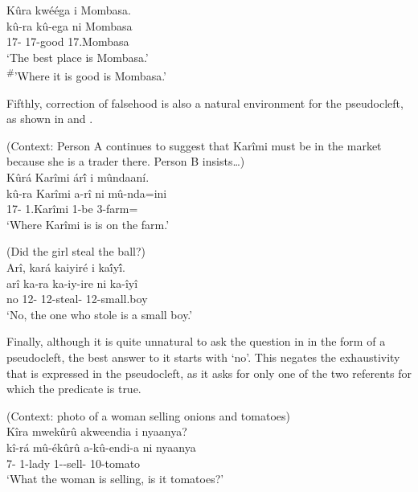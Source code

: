 \documentclass[output=paper]{langscibook}
\begin{document}
\ea
\label{bkm:Ref111648598}
Kûra kwééga i Mombasa.\\
\gll
kû-ra  kû-ega  ni  Mombasa\\
17-\RM{} 17-good \COP{} 17.Mombasa\\
\glt
‘The best place is Mombasa.’\\
\textsuperscript{\#}’Where it is good is Mombasa.’

\z


Fifthly, correction of falsehood is also a natural environment for the pseudocleft, as shown in  and .

\ea
\label{bkm:Ref111707394}
(Context: Person A continues to suggest that Karîmi must be in the market because she is a trader there. Person B insists…)\\
Kûrá Karîmi ár\'{î} i mûndaaní.\\
\gll
kû-ra  Karîmi  a-rî  ni  mû-nda=ini\\
17-\RM{} 1.Karîmi  1\SM{}-be \COP{} 3-farm=\LOC{}\\
\glt
‘Where Karîmi is is on the farm.’

\z

\ea
\label{bkm:Ref111707395}
(Did the girl steal the ball?)\\
Arî, kará kaiyiré i ka\'{î}y\'{î}.\\
\gll
arî  ka-ra  ka-iy-ire  ni  ka-îyî\\
no  12-\RM{} 12-steal-\PFV{} \COP{} 12-small.boy\\
\glt
‘No, the one who stole is a small boy.’

\z


Finally, although it is quite unnatural to ask the question in  in the form of a pseudocleft, the best answer to it starts with ‘no’. This negates the exhaustivity that is expressed in the pseudocleft, as it asks for only one of the two referents for which the predicate is true.

\ea
\label{bkm:Ref111982718}
(Context: photo of a woman selling onions and tomatoes)\\
Kîra mwekûrû akweendia i nyaanya?\\
\gll
kî-rá  mû-ékûrû  a-kû-endi-a  ni  nyaanya\\
7-\RM{} 1-lady 1\SM-\PRS{}-sell-\FV{} \COP{} 10-tomato\\
\glt
‘What the woman is selling, is it tomatoes?’
\end{document}
